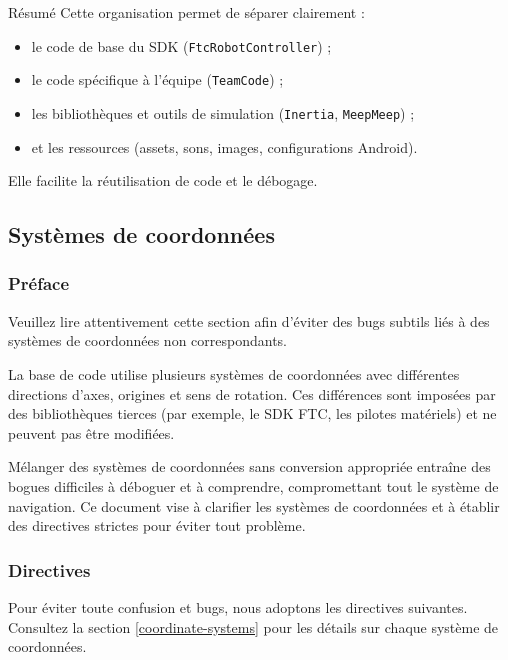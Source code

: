 \documentclass[12pt, a4paper]{report}
\begin{document}
    \begin{myinfo}{Résumé}
        Cette organisation permet de séparer clairement :
        \begin{itemize}
            \item le code de base du SDK (\texttt{FtcRobotController}) ;
            \item le code spécifique à l’équipe (\texttt{TeamCode}) ;
            \item les bibliothèques et outils de simulation (\texttt{Inertia}, \texttt{MeepMeep}) ;
            \item et les ressources (assets, sons, images, configurations Android).
        \end{itemize}
        Elle facilite la réutilisation de code et le débogage.
    \end{myinfo}

    \subsection{Systèmes de coordonnées}


    \subsubsection*{Préface}

    Veuillez lire attentivement cette section afin d'éviter des bugs subtils liés à des systèmes de coordonnées non correspondants.

    La base de code utilise plusieurs systèmes de coordonnées avec différentes directions d'axes,
    origines et sens de rotation. Ces différences sont imposées par des bibliothèques tierces
    (par exemple, le SDK FTC, les pilotes matériels) et ne peuvent pas être modifiées.

    Mélanger des systèmes de coordonnées sans conversion appropriée entraîne des bogues difficiles à déboguer et à comprendre, compromettant tout le système de navigation. Ce document vise à clarifier les systèmes de coordonnées et à établir des directives strictes pour éviter tout problème.

    \subsubsection*{Directives}

    Pour éviter toute confusion et bugs, nous adoptons les directives suivantes. Consultez la section \ref{coordinate-systems} pour les détails sur chaque système de coordonnées.
\end{document}
